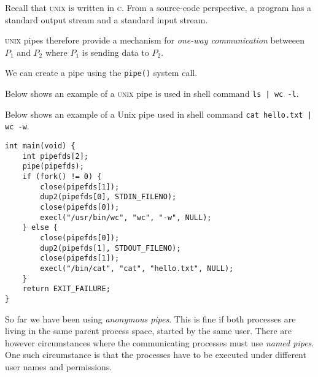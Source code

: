Recall that \textsc{unix} is written in \textsc{c}. From a source-code perspective, 
a program has a standard output stream and a standard input stream. 


\textsc{unix} pipes therefore provide a mechanism
for \textit{one-way communication} betweeen $P_1$ and $P_2$ where 
$P_1$ is sending data to $P_2$. 

We can create a pipe using the \lstinline{pipe()} system call.




\begin{example}
Below shows an example of a \textsc{unix} pipe is used 
in shell command \lstinline{ls | wc -l}.

\begin{figure}[h]
\end{figure} 
\end{example}



\frmrule

\begin{example}
Below shows an example of a Unix pipe used in shell command \lstinline{cat hello.txt | wc -w}.

\begin{lstlisting}
int main(void) {
    int pipefds[2];
    pipe(pipefds);
    if (fork() != 0) { 
        close(pipefds[1]);
        dup2(pipefds[0], STDIN_FILENO);
        close(pipefds[0]);
        execl("/usr/bin/wc", "wc", "-w", NULL);
    } else { 
        close(pipefds[0]);
        dup2(pipefds[1], STDOUT_FILENO);
        close(pipefds[1]);
        execl("/bin/cat", "cat", "hello.txt", NULL);
    }
    return EXIT_FAILURE;
}
\end{lstlisting}
\end{example}



\frmrule

So far we have been using \textit{anonymous pipes}. This is fine if both 
processes are living in the same parent process space, 
started by the same user. 
There are however circumstances where the communicating processes
must use \textit{named pipes}. One such circumstance is that the processes have to be executed under different user names and permissions.


